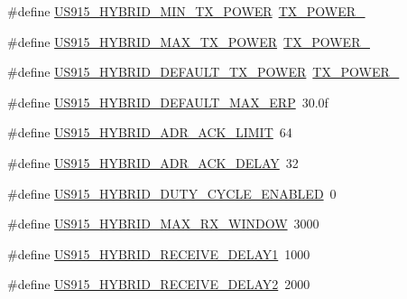 \begin{DoxyCompactItemize}
\item 
\#define \mbox{\hyperlink{group___r_e_g_i_o_n_u_s915_h_y_b_ga0aece8c836bf5bf19a28589cb3cda70e}{U\+S915\+\_\+\+H\+Y\+B\+R\+I\+D\+\_\+\+M\+I\+N\+\_\+\+T\+X\+\_\+\+P\+O\+W\+ER}}~\mbox{\hyperlink{group___r_e_g_i_o_n_gac9747c69350f34d485c3134e5a57655b}{T\+X\+\_\+\+P\+O\+W\+E\+R\+\_}}
\item 
\#define \mbox{\hyperlink{group___r_e_g_i_o_n_u_s915_h_y_b_ga94a1ed1e5cca1f05f0ac4916e164f529}{U\+S915\+\_\+\+H\+Y\+B\+R\+I\+D\+\_\+\+M\+A\+X\+\_\+\+T\+X\+\_\+\+P\+O\+W\+ER}}~\mbox{\hyperlink{group___r_e_g_i_o_n_gab33618449f2a573142c463ab071ef8ed}{T\+X\+\_\+\+P\+O\+W\+E\+R\+\_}}
\item 
\#define \mbox{\hyperlink{group___r_e_g_i_o_n_u_s915_h_y_b_gac33efe45e6e9b5ac53a97b4ed314c28e}{U\+S915\+\_\+\+H\+Y\+B\+R\+I\+D\+\_\+\+D\+E\+F\+A\+U\+L\+T\+\_\+\+T\+X\+\_\+\+P\+O\+W\+ER}}~\mbox{\hyperlink{group___r_e_g_i_o_n_gab33618449f2a573142c463ab071ef8ed}{T\+X\+\_\+\+P\+O\+W\+E\+R\+\_}}
\item 
\#define \mbox{\hyperlink{group___r_e_g_i_o_n_u_s915_h_y_b_gac045f9e8230d0740b4676fbade801432}{U\+S915\+\_\+\+H\+Y\+B\+R\+I\+D\+\_\+\+D\+E\+F\+A\+U\+L\+T\+\_\+\+M\+A\+X\+\_\+\+E\+RP}}~30.\+0f
\item 
\#define \mbox{\hyperlink{group___r_e_g_i_o_n_u_s915_h_y_b_ga1a479117e6e72786f00838f96288ecfd}{U\+S915\+\_\+\+H\+Y\+B\+R\+I\+D\+\_\+\+A\+D\+R\+\_\+\+A\+C\+K\+\_\+\+L\+I\+M\+IT}}~64
\item 
\#define \mbox{\hyperlink{group___r_e_g_i_o_n_u_s915_h_y_b_gad0a445c397f7510c7ebdca13b5197389}{U\+S915\+\_\+\+H\+Y\+B\+R\+I\+D\+\_\+\+A\+D\+R\+\_\+\+A\+C\+K\+\_\+\+D\+E\+L\+AY}}~32
\item 
\#define \mbox{\hyperlink{group___r_e_g_i_o_n_u_s915_h_y_b_ga7d99e44bc983c9f9e453640cc13712bf}{U\+S915\+\_\+\+H\+Y\+B\+R\+I\+D\+\_\+\+D\+U\+T\+Y\+\_\+\+C\+Y\+C\+L\+E\+\_\+\+E\+N\+A\+B\+L\+ED}}~0
\item 
\#define \mbox{\hyperlink{group___r_e_g_i_o_n_u_s915_h_y_b_ga1420db342d8dc812b2d4f033df8d2a9c}{U\+S915\+\_\+\+H\+Y\+B\+R\+I\+D\+\_\+\+M\+A\+X\+\_\+\+R\+X\+\_\+\+W\+I\+N\+D\+OW}}~3000
\item 
\#define \mbox{\hyperlink{group___r_e_g_i_o_n_u_s915_h_y_b_ga7f976c7a9c51b01109f0b18c9c9d14a7}{U\+S915\+\_\+\+H\+Y\+B\+R\+I\+D\+\_\+\+R\+E\+C\+E\+I\+V\+E\+\_\+\+D\+E\+L\+A\+Y1}}~1000
\item 
\#define \mbox{\hyperlink{group___r_e_g_i_o_n_u_s915_h_y_b_ga253fc685fda5fcc97f80f92be8d5fcf2}{U\+S915\+\_\+\+H\+Y\+B\+R\+I\+D\+\_\+\+R\+E\+C\+E\+I\+V\+E\+\_\+\+D\+E\+L\+A\+Y2}}~2000

\end{DoxyCompactItemize}
